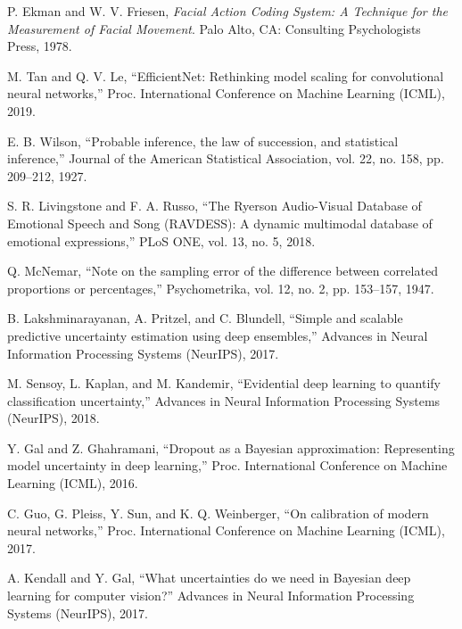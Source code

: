 \begin{ieeerefs}

\item
P. Ekman and W. V. Friesen,
\emph{Facial Action Coding System: A Technique for the Measurement of Facial Movement}.
Palo Alto, CA: Consulting Psychologists Press, 1978.

\item
M. Tan and Q. V. Le,
``EfficientNet: Rethinking model scaling for convolutional neural networks,''
Proc. International Conference on Machine Learning (ICML), 2019.

\item
E. B. Wilson,
``Probable inference, the law of succession, and statistical inference,''
Journal of the American Statistical Association, vol. 22, no. 158, pp. 209--212, 1927.

\item
S. R. Livingstone and F. A. Russo,
``The Ryerson Audio-Visual Database of Emotional Speech and Song (RAVDESS): A dynamic multimodal database of emotional expressions,''
PLoS ONE, vol. 13, no. 5, 2018.

\item
Q. McNemar,
``Note on the sampling error of the difference between correlated proportions or percentages,''
Psychometrika, vol. 12, no. 2, pp. 153--157, 1947.

\item
B. Lakshminarayanan, A. Pritzel, and C. Blundell,
``Simple and scalable predictive uncertainty estimation using deep ensembles,''
Advances in Neural Information Processing Systems (NeurIPS), 2017.

\item
M. Sensoy, L. Kaplan, and M. Kandemir,
``Evidential deep learning to quantify classification uncertainty,''
Advances in Neural Information Processing Systems (NeurIPS), 2018.

\item
Y. Gal and Z. Ghahramani,
``Dropout as a Bayesian approximation: Representing model uncertainty in deep learning,''
Proc. International Conference on Machine Learning (ICML), 2016.

\item
C. Guo, G. Pleiss, Y. Sun, and K. Q. Weinberger,
``On calibration of modern neural networks,''
Proc. International Conference on Machine Learning (ICML), 2017.

\item
A. Kendall and Y. Gal,
``What uncertainties do we need in Bayesian deep learning for computer vision?''
Advances in Neural Information Processing Systems (NeurIPS), 2017.

\end{ieeerefs}


